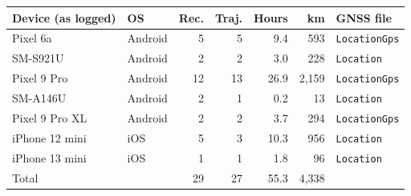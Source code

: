 \begin{tabular}{llrrrrl}
\toprule
Device (as logged) & OS & Rec. & Traj. & Hours & km & GNSS file \\
\midrule
Pixel 6a & Android & 5 & 5 & 9.4 & 593 & \texttt{LocationGps} \\
SM-S921U & Android & 2 & 2 & 3.0 & 228 & \texttt{Location} \\
Pixel 9 Pro & Android & 12 & 13 & 26.9 & 2{,}159 & \texttt{LocationGps} \\
SM-A146U & Android & 2 & 1 & 0.2 & 13 & \texttt{Location} \\
Pixel 9 Pro XL & Android & 2 & 2 & 3.7 & 294 & \texttt{LocationGps} \\
iPhone 12 mini & iOS & 5 & 3 & 10.3 & 956 & \texttt{Location} \\
iPhone 13 mini & iOS & 1 & 1 & 1.8 & 96 & \texttt{Location} \\
\midrule
Total & & 29 & 27 & 55.3 & 4{,}338 & \\
\bottomrule
\end{tabular}
